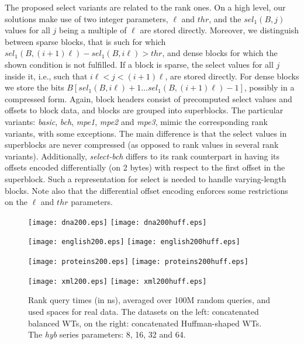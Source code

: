 \documentclass{llncs}
\begin{document}
The proposed select variants are related to the rank ones.
On a high level, our solutions make use of two integer parameters, 
$\ell$ and $thr$, and the $sel_1(B, j)$ values for all $j$ being a multiple 
of $\ell$ are stored directly.
Moreover, we distinguish between sparse blocks, that is such for which 
$sel_1(B, (i+1)\ell) - sel_1(B, i\ell) > thr$, and dense blocks for which 
the shown condition is not fulfilled.
If a block is sparse, the select values for all $j$ inside it, 
i.e., such that $i\ell < j < (i+1)\ell$, are stored directly.
For dense blocks we store the bits 
$B[sel_1(B, i\ell)+1 \ldots sel_1(B, (i+1)\ell)-1]$, 
possibly in a compressed form.
Again, block headers consist of precomputed select values and offsets to block data, 
and blocks are grouped into superblocks.
The particular variants: {\em basic}, {\em bch}, {\em mpe1}, {\em mpe2} and 
{\em mpe3}, mimic the corresponding rank variants, with some exceptions.
The main difference is that the select values in superblocks are never compressed 
(as opposed to rank values in several rank variants).
Additionally, {\em select-bch} differs to its rank counterpart in having 
its offsets encoded differentially (on 2 bytes) with respect to the first offset 
in the superblock.
Such a representation for select is needed to handle varying-length blocks.
Note also that the differential offset encoding enforces some restrictions 
on the $\ell$ and $thr$ parameters.



\begin{figure}
\centerline{
\texttt{[image: dna200.eps]}
\texttt{[image: dna200huff.eps]}
}
\centerline{
\texttt{[image: english200.eps]}
\texttt{[image: english200huff.eps]}
}
\centerline{
\texttt{[image: proteins200.eps]}
\texttt{[image: proteins200huff.eps]}
}
\centerline{
\texttt{[image: xml200.eps]}
\texttt{[image: xml200huff.eps]}
}

\caption[Results]
{Rank query times (in ns), averaged over 100M random queries,
and used spaces for real data.
The datasets on the left: concatenated balanced WTs, 
on the right: concatenated Huffman-shaped WTs.
The {\em hyb} series parameters: 8, 16, 32 and 64.
}
\label{fig:cranks1}
\end{figure}
\end{document}

